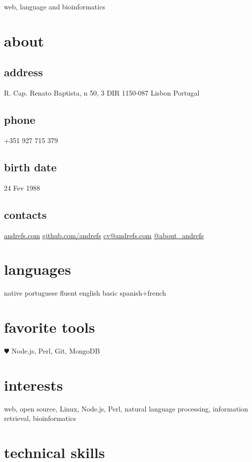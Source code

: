 \documentclass[a4paper]{friggeri-cv}
\begin{document}
       {web, language and bioinformatics}



\begin{aside}
  \section{about}
\begin{sensitive}
    \subsection{address}
    {\small R. Cap. Renato Baptista,
    n 50, 3 DIR
    1150-087 Lisbon
    Portugal}
    \subsection{phone}
    +351 927 715 379
    \subsection{birth date}
    24 Fev 1988
\end{sensitive}
    \subsection{contacts}
    \url{andrefs.com}
    \url{github.com/andrefs} \faGithub
    \href{mailto:cv@andrefs.com}{cv@andrefs.com} \faEnvelope
    \href{http://witter.com/about_andrefs}{@about\_andrefs} \faTwitter
  \section{languages}
    native portuguese
    fluent english
    basic spanish+french
  \section{favorite tools}
    {$\varheartsuit$} Node.js, Perl, Git, MongoDB
\end{aside}

\section{interests}
{\large{web, open source, Linux, Node.js, Perl, natural language
processing, information retrieval, bioinformatics}}

\section{technical skills}
\end{document}
